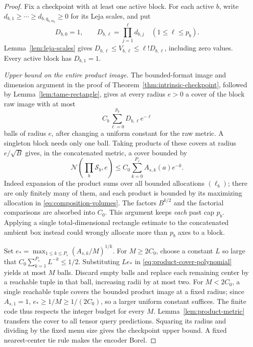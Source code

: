 \begin{proof}
Fix a checkpoint with at least one active block. For each active $b$,
write $d_{b,1}\ge\cdots\ge d_{b,q_{b,m_b}}\ge0$ for its Leja
scales, and put
\[
 D_{b,0}=1,\qquad D_{b,\ell}=\prod_{j=1}^{\ell}d_{b,j}
       \quad(1\le\ell\le p_b).
\]
Lemma~\ref{lem:leja-scales} gives
$D_{b,\ell}\le V_{b,\ell}\le\ell!D_{b,\ell}$, including zero
values. Every active block has $D_{b,1}=1$.

\emph{Upper bound on the entire product image.}
The bounded-format image and dimension argument in the proof of
Theorem~\ref{thm:intrinsic-checkpoint}, followed by
Lemma~\ref{lem:tame-rectangle}, gives at every radius $e>0$ a cover
of the block raw image with at most
\[
 C_b\sum_{\ell=0}^{p_b}D_{b,\ell}e^{-\ell}
\]
balls of radius $e$, after changing a uniform constant for the raw metric.
A singleton block needs only one ball. Taking products of these covers
at radius $e/\sqrt B$ gives, in the concatenated metric, a cover bounded
by
\begin{equation}\label{eq:product-cover-polynomial}
 \mathcal N\left(\prod_b\mathcal S_b,e\right)
 \le C_0\sum_{k=0}^{P_s} A_{s,k}(a)e^{-k}.
\end{equation}
Indeed expansion of the product sums over all bounded allocations
$(\ell_b)$; there are only finitely many of them, and each product is
bounded by its maximizing allocation in \eqref{eq:composition-volumes}.
The factors $B^{k/2}$ and the factorial comparisons are absorbed into
$C_0$. This argument keeps \emph{each} past cap $p_b$. Applying a
single total-dimensional rectangle estimate to the concatenated ambient
box instead could wrongly allocate more than $p_b$ axes to a block.

Set $e_* =\max_{1\le k\le P_s}(A_{s,k}/M)^{1/k}$.
For $M\ge2C_0$, choose a constant $L$ so large that
$C_0\sum_{k=1}^{P_s}L^{-k}\le1/2$. Substituting $Le_*$ in
\eqref{eq:product-cover-polynomial} yields at most $M$ balls.
Discard empty balls and replace each remaining center by a reachable
tuple in that ball, increasing radii by at most two. For $M<2C_0$,
a single reachable tuple covers the bounded product image at a fixed
radius; since $A_{s,1}=1$, $e_*\ge1/M\ge1/(2C_0)$, so a larger
uniform constant suffices. The finite code thus respects the integer
budget for every $M$. Lemma~\ref{lem:product-metric} transfers the
cover to all tensor query predictions. Squaring its radius and dividing
by the fixed menu size gives the checkpoint upper bound. A fixed
nearest-center tie rule makes the encoder Borel.


\end{proof}
